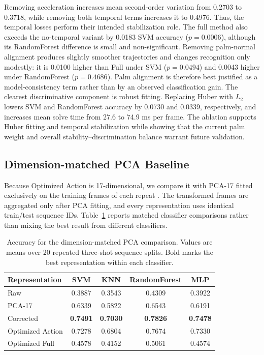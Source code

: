 \documentclass[11pt]{article}
\begin{document}
Removing acceleration increases mean second-order variation from 0.2703 to 0.3718, while removing both temporal terms increases it to 0.4976. Thus, the temporal losses perform their intended stabilization role. The full method also exceeds the no-temporal variant by 0.0183 SVM accuracy ($p=0.0006$), although its RandomForest difference is small and non-significant. Removing palm-normal alignment produces slightly smoother trajectories and changes recognition only modestly: it is 0.0100 higher than Full under SVM ($p=0.0494$) and 0.0043 higher under RandomForest ($p=0.4686$). Palm alignment is therefore best justified as a model-consistency term rather than by an observed classification gain. The clearest discriminative component is robust fitting. Replacing Huber with $L_2$ lowers SVM and RandomForest accuracy by 0.0730 and 0.0339, respectively, and increases mean solve time from 27.6 to 74.9 ms per frame. The ablation supports Huber fitting and temporal stabilization while showing that the current palm weight and overall stability--discrimination balance warrant future validation.

\FloatBarrier
\subsection{Dimension-matched PCA Baseline}
Because Optimized Action is 17-dimensional, we compare it with PCA-17 fitted exclusively on the training frames of each repeat \cite{jolliffe2002pca}. The transformed frames are aggregated only after PCA fitting, and every representation uses identical train/test sequence IDs. Table~\ref{tab:pca_comparison} reports matched classifier comparisons rather than mixing the best result from different classifiers.

\begin{table}[!t]
\centering
\caption{Accuracy for the dimension-matched PCA comparison. Values are means over 20 repeated three-shot sequence splits. Bold marks the best representation within each classifier.}
\label{tab:pca_comparison}
\footnotesize
\begin{tabular}{@{}lcccc@{}}
\toprule
Representation & SVM & KNN & RandomForest & MLP \\
\midrule
Raw & 0.3887 & 0.3543 & 0.4309 & 0.3922 \\
PCA-17 & 0.6339 & 0.5822 & 0.6543 & 0.6191 \\
Corrected & \textbf{0.7491} & \textbf{0.7030} & \textbf{0.7826} & \textbf{0.7478} \\
Optimized Action & 0.7278 & 0.6804 & 0.7674 & 0.7330 \\
Optimized Full & 0.4578 & 0.4152 & 0.5061 & 0.4574 \\
\bottomrule
\end{tabular}
\end{table}
\end{document}
